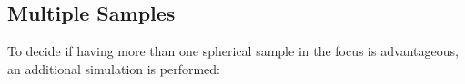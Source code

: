 



\subsection{Multiple Samples}
To decide if having more than one spherical sample in the focus is advantageous, an additional simulation is performed:
 
